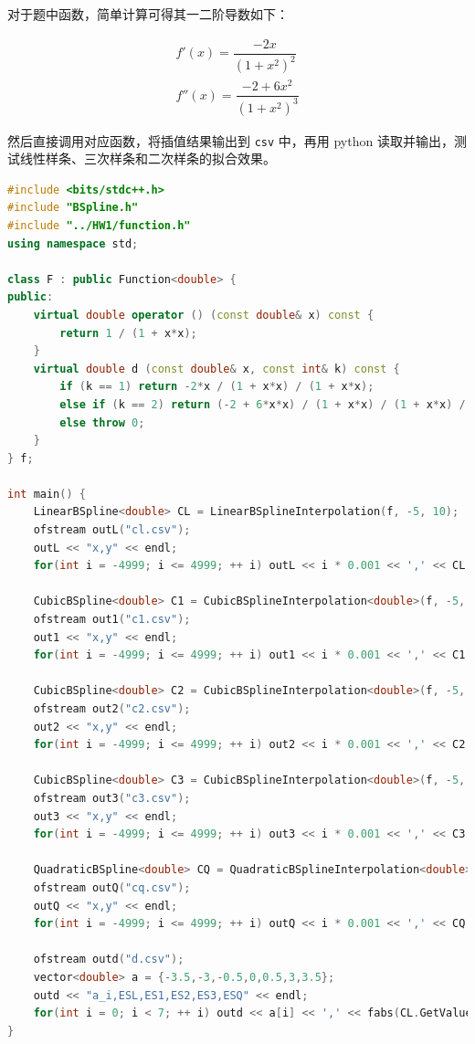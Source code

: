 \documentclass{ctexart}
\begin{document}
对于题中函数，简单计算可得其一二阶导数如下：

\begin{gather}
f'(x)=\dfrac {-2x}{(1+x^2)^2} \\
f''(x)=\dfrac {-2+6x^2}{(1+x^2)^3}
\end{gather}

然后直接调用对应函数，将插值结果输出到 \verb|csv| 中，再用 python 读取并输出，测试线性样条、三次样条和二次样条的拟合效果。

\begin{lstlisting}[language={c++}]
#include <bits/stdc++.h>
#include "BSpline.h"
#include "../HW1/function.h"
using namespace std;

class F : public Function<double> {
public:
	virtual double operator () (const double& x) const {
		return 1 / (1 + x*x);
	}
	virtual double d (const double& x, const int& k) const {
		if (k == 1) return -2*x / (1 + x*x) / (1 + x*x);
		else if (k == 2) return (-2 + 6*x*x) / (1 + x*x) / (1 + x*x) / (1 + x*x);
		else throw 0;
	}
} f;

int main() {
	LinearBSpline<double> CL = LinearBSplineInterpolation(f, -5, 10);
	ofstream outL("cl.csv");
	outL << "x,y" << endl;
	for(int i = -4999; i <= 4999; ++ i) outL << i * 0.001 << ',' << CL.GetValue(i * 0.001) << endl;

	CubicBSpline<double> C1 = CubicBSplineInterpolation<double>(f, -5, 10, "Natural");
	ofstream out1("c1.csv");
	out1 << "x,y" << endl;
	for(int i = -4999; i <= 4999; ++ i) out1 << i * 0.001 << ',' << C1.GetValue(i * 0.001) << endl;

	CubicBSpline<double> C2 = CubicBSplineInterpolation<double>(f, -5, 10, "Complete");
	ofstream out2("c2.csv");
	out2 << "x,y" << endl;
	for(int i = -4999; i <= 4999; ++ i) out2 << i * 0.001 << ',' << C2.GetValue(i * 0.001) << endl;

	CubicBSpline<double> C3 = CubicBSplineInterpolation<double>(f, -5, 10, "Specified_Second_Derivatives");
	ofstream out3("c3.csv");
	out3 << "x,y" << endl;
	for(int i = -4999; i <= 4999; ++ i) out3 << i * 0.001 << ',' << C3.GetValue(i * 0.001) << endl;
	
	QuadraticBSpline<double> CQ = QuadraticBSplineInterpolation<double>(f, -5, 10);
	ofstream outQ("cq.csv");
	outQ << "x,y" << endl;
	for(int i = -4999; i <= 4999; ++ i) outQ << i * 0.001 << ',' << CQ.GetValue(i * 0.001) << endl;

	ofstream outd("d.csv");
	vector<double> a = {-3.5,-3,-0.5,0,0.5,3,3.5};
	outd << "a_i,ESL,ES1,ES2,ES3,ESQ" << endl;
	for(int i = 0; i < 7; ++ i) outd << a[i] << ',' << fabs(CL.GetValue(a[i]) - f(a[i])) << ',' << fabs(C1.GetValue(a[i]) - f(a[i])) << ',' << fabs(C2.GetValue(a[i]) - f(a[i])) << ',' << fabs(C3.GetValue(a[i]) - f(a[i])) << ',' << fabs(CQ.GetValue(a[i]) - f(a[i])) << endl;
}
\end{lstlisting}
\end{document}
